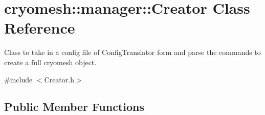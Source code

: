 \hypertarget{classcryomesh_1_1manager_1_1Creator}{\section{cryomesh\-:\-:manager\-:\-:\-Creator \-Class \-Reference}
\label{classcryomesh_1_1manager_1_1Creator}
}


\-Class to take in a config file of \-Config\-Translator form and parse the commands to create a full cryomesh object.  




{\ttfamily \#include $<$\-Creator.\-h$>$}

\subsection*{\-Public \-Member \-Functions}
